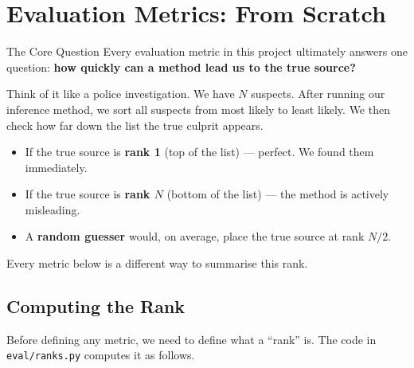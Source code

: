 \section{Evaluation Metrics: From Scratch}
\label{sec:metrics}

\begin{conceptbox}{The Core Question}
Every evaluation metric in this project ultimately answers one question: \textbf{how quickly can a method lead us to the true source?}

Think of it like a police investigation. We have $N$ suspects. After running our inference method, we sort all suspects from most likely to least likely. We then check how far down the list the true culprit appears.
\begin{itemize}
    \item If the true source is \textbf{rank 1} (top of the list) --- perfect. We found them immediately.
    \item If the true source is \textbf{rank $N$} (bottom of the list) --- the method is actively misleading.
    \item A \textbf{random guesser} would, on average, place the true source at rank $N/2$.
\end{itemize}
Every metric below is a different way to summarise this rank.
\end{conceptbox}

\subsection{Computing the Rank}

Before defining any metric, we need to define what a ``rank'' is. The code in \texttt{eval/ranks.py} computes it as follows.

